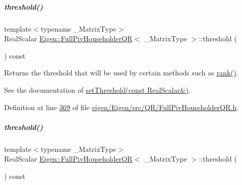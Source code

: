 \mbox{\label{group___q_r___module_af7f6ac15ca19c2b9e45dc3eaae58c201}} 
\subparagraph{\texorpdfstring{threshold()}{threshold()}\hspace{0.1cm}{\footnotesize\ttfamily [1/2]}}
{\footnotesize\ttfamily template$<$typename \+\_\+\+Matrix\+Type$>$ \\
Real\+Scalar \hyperlink{group___q_r___module_class_eigen_1_1_full_piv_householder_q_r}{Eigen\+::\+Full\+Piv\+Householder\+QR}$<$ \+\_\+\+Matrix\+Type $>$\+::threshold (\begin{DoxyParamCaption}{ }\end{DoxyParamCaption}) const\hspace{0.3cm}{\ttfamily [inline]}}

Returns the threshold that will be used by certain methods such as \hyperlink{group___q_r___module_aeae555220f46477818ccc94aca2de770}{rank()}.

See the documentation of \hyperlink{group___q_r___module_a92277e572bf98245891015d12dd2b602}{set\+Threshold(const Real\+Scalar\&)}. 

Definition at line \hyperlink{eigen_2_eigen_2src_2_q_r_2_full_piv_householder_q_r_8h_source_l00369}{369} of file \hyperlink{eigen_2_eigen_2src_2_q_r_2_full_piv_householder_q_r_8h_source}{eigen/\+Eigen/src/\+Q\+R/\+Full\+Piv\+Householder\+Q\+R.\+h}.

\mbox{\label{group___q_r___module_af7f6ac15ca19c2b9e45dc3eaae58c201}} 
\subparagraph{\texorpdfstring{threshold()}{threshold()}\hspace{0.1cm}{\footnotesize\ttfamily [2/2]}}
{\footnotesize\ttfamily template$<$typename \+\_\+\+Matrix\+Type$>$ \\
Real\+Scalar \hyperlink{group___q_r___module_class_eigen_1_1_full_piv_householder_q_r}{Eigen\+::\+Full\+Piv\+Householder\+QR}$<$ \+\_\+\+Matrix\+Type $>$\+::threshold (\begin{DoxyParamCaption}{ }\end{DoxyParamCaption}) const\hspace{0.3cm}{\ttfamily [inline]}}

